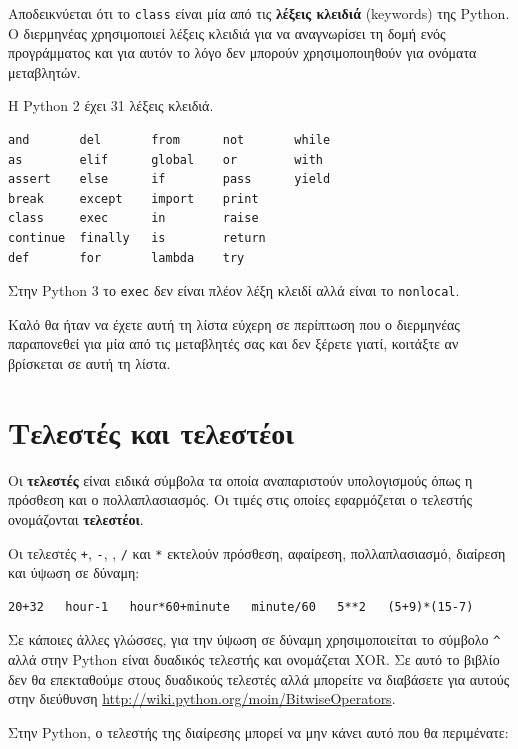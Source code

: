 \documentclass[10pt]{book}
\begin{document}
Αποδεικνύεται ότι το {\tt class} είναι μία από τις {\bf λέξεις κλειδιά} (keywords) της 
Python. Ο διερμηνέας χρησιμοποιεί λέξεις κλειδιά για να αναγνωρίσει τη δομή ενός
προγράμματος και για αυτόν το λόγο δεν μπορούν χρησιμοποιηθούν για ονόματα μεταβλητών.


Η Python 2 έχει 31 λέξεις κλειδιά.

\begin{verbatim}
and       del       from      not       while
as        elif      global    or        with
assert    else      if        pass      yield
break     except    import    print
class     exec      in        raise
continue  finally   is        return
def       for       lambda    try
\end{verbatim}
%

Στην Python 3 το {\tt exec} δεν είναι πλέον λέξη κλειδί αλλά είναι το 
{\tt nonlocal}.

Καλό θα ήταν να έχετε αυτή τη λίστα εύχερη σε περίπτωση που ο διερμηνέας παραπονεθεί για μία από τις μεταβλητές σας και δεν ξέρετε γιατί, κοιτάξτε αν βρίσκεται σε αυτή τη λίστα.


\section{Τελεστές και τελεστέοι}

Οι {\bf τελεστές} είναι ειδικά σύμβολα τα οποία αναπαριστούν υπολογισμούς
όπως η πρόσθεση και ο πολλαπλασιασμός. Οι τιμές στις οποίες εφαρμόζεται
ο τελεστής ονομάζονται {\bf τελεστέοι}.

Οι τελεστές  {\tt +}, {\tt -}, {\tt *}, {\tt /}  και  {\tt **}
εκτελούν πρόσθεση, αφαίρεση, πολλαπλασιασμό, διαίρεση και ύψωση σε
δύναμη:


\begin{verbatim}
20+32   hour-1   hour*60+minute   minute/60   5**2   (5+9)*(15-7)
\end{verbatim}
%

Σε κάποιες άλλες γλώσσες, για την ύψωση σε δύναμη χρησιμοποιείται το
σύμβολο \verb"^" αλλά στην Python είναι δυαδικός
τελεστής και ονομάζεται XOR. Σε αυτό το βιβλίο δεν θα επεκταθούμε
στους δυαδικούς τελεστές αλλά μπορείτε να διαβάσετε για αυτούς στην
διεύθυνση \url{http://wiki.python.org/moin/BitwiseOperators}.

Στην Python, ο τελεστής της διαίρεσης μπορεί να μην κάνει
αυτό που θα περιμένατε:
\end{document}

